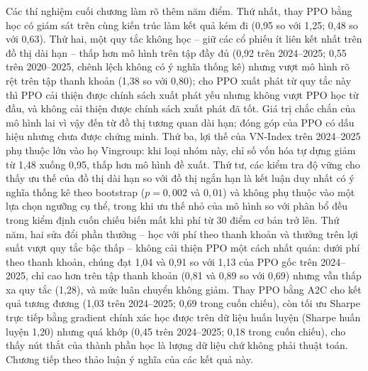 Các thí nghiệm cuối chương làm rõ thêm năm điểm. Thứ nhất, thay PPO bằng học có giám sát trên cùng kiến trúc làm kết quả kém đi (0,95 so với 1,25; 0,48 so với 0,63). Thứ hai, một quy tắc không học -- giữ các cổ phiếu ít liên kết nhất trên đồ thị dài hạn -- thấp hơn mô hình trên tập đầy đủ (0,92 trên 2024--2025; 0,55 trên 2020--2025, chênh lệch không có ý nghĩa thống kê) nhưng vượt mô hình rõ rệt trên tập thanh khoản (1,38 so với 0,80); cho PPO xuất phát từ quy tắc này thì PPO cải thiện được chính sách xuất phát yếu nhưng không vượt PPO học từ đầu, và không cải thiện được chính sách xuất phát đã tốt. Giá trị chắc chắn của mô hình lai vì vậy đến từ đồ thị tương quan dài hạn; đóng góp của PPO có dấu hiệu nhưng chưa được chứng minh. Thứ ba, lợi thế của VN-Index trên 2024--2025 phụ thuộc lớn vào họ Vingroup: khi loại nhóm này, chỉ số vốn hóa tự dựng giảm từ 1,48 xuống 0,95, thấp hơn mô hình đề xuất. Thứ tư, các kiểm tra độ vững cho thấy ưu thế của đồ thị dài hạn so với đồ thị ngắn hạn là kết luận duy nhất có ý nghĩa thống kê theo bootstrap ($p = 0{,}002$ và $0{,}01$) và không phụ thuộc vào một lựa chọn ngưỡng cụ thể, trong khi ưu thế nhỏ của mô hình so với phân bổ đều trong kiểm định cuốn chiếu biến mất khi phí từ 30 điểm cơ bản trở lên. Thứ năm, hai sửa đổi phần thưởng -- học với phí theo thanh khoản và thưởng trên lợi suất vượt quy tắc bậc thấp -- không cải thiện PPO một cách nhất quán: dưới phí theo thanh khoản, chúng đạt 1,04 và 0,91 so với 1,13 của PPO gốc trên 2024--2025, chỉ cao hơn trên tập thanh khoản (0,81 và 0,89 so với 0,69) nhưng vẫn thấp xa quy tắc (1,28), và mức luân chuyển không giảm. Thay PPO bằng A2C cho kết quả tương đương (1,03 trên 2024--2025; 0,69 trong cuốn chiếu), còn tối ưu Sharpe trực tiếp bằng gradient chính xác học được trên dữ liệu huấn luyện (Sharpe huấn luyện 1,20) nhưng quá khớp (0,45 trên 2024--2025; 0,18 trong cuốn chiếu), cho thấy nút thắt của thành phần học là lượng dữ liệu chứ không phải thuật toán. Chương tiếp theo thảo luận ý nghĩa của các kết quả này.
